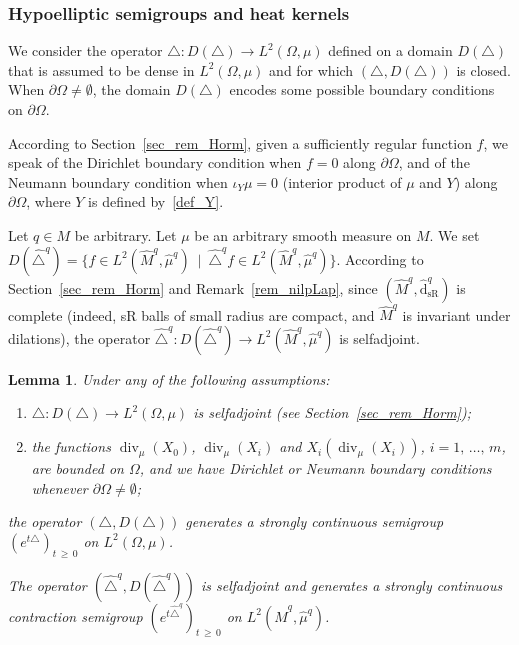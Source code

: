 \documentclass[10pt]{amsart}
\newtheorem{lemm}[theo]{Lemma}\newtheorem{prop}[theo]{Proposition}\newtheorem{coro}[theo]{Corollary}\newtheorem{conj}[theo]{Conjecture}
\theoremstyle{definition}\newtheorem{defi}[theo]{Definition}\newtheorem{rema}[theo]{Remark}\newtheorem{exam}[theo]{Example}\newtheorem{exem}[theo]{Example}\newtheorem{nota}[theo]{Notation}
\DeclareMathOperator{\divl}{div}
\newcommand{\hatdsR}{\widehat{\mathrm{d}}_{\mathrm{sR}}}
\renewcommand{\geq}{\geqslant}
\newcommand*{\Alphenumi}{\renewcommand*{\theenumi}{\bf{\Alph{enumi}}}}
\begin{document}
\subsubsection{Hypoelliptic semigroups and heat kernels}\label{sec_kernel}
We consider the operator $\triangle:D(\triangle)\rightarrow L^2(\Omega,\mu)$ defined on a domain $D(\triangle)$ that is assumed to be dense in $L^2(\Omega,\mu)$ and for which $(\triangle,D(\triangle))$ is closed. When $\partial\Omega\neq\emptyset$, the domain $D(\triangle)$ encodes some possible boundary conditions on $\partial\Omega$.

According to Section~\ref{sec_rem_Horm}, given a sufficiently regular function $f$, we speak of the Dirichlet boundary condition when $f=0$ along $\partial\Omega$, and of the Neumann boundary condition when $\iota_Y\mu=0$ (interior product of $\mu$ and $Y$) along $\partial\Omega$, where $Y$ is defined by~\eqref{def_Y}.


Let $q\in M$ be arbitrary. Let $\mu$ be an arbitrary smooth measure on $M$. We set $D(\widehat{\triangle}^{q}) = \{ f\in L^2(\widehat M^{q},\widehat\mu^{q})\ \mid\ \widehat{\triangle}^{q} f\in L^2(\widehat M^{q},\widehat\mu^{q}) \}$. According to Section~\ref{sec_rem_Horm} and Remark~\ref{rem_nilpLap}, since $(\widehat M^{q},\hatdsR^{q})$ is complete (indeed, sR balls of small radius are compact, and $\widehat M^{q}$ is invariant under dilations), the operator $\widehat{\triangle}^{q}:D(\widehat{\triangle}^{q})\rightarrow L^2(\widehat M^{q},\widehat\mu^{q})$ is selfadjoint.

\begin{lemm}\label{lem_semigroup}
Under any of the following assumptions:
\begin{enumerate}\Alphenumi
\item\label{caseA}
$\triangle:D(\triangle)\rightarrow L^2(\Omega,\mu)$ is selfadjoint (see Section~\ref{sec_rem_Horm});
\item\label{caseB}
the functions $\divl_\mu(X_0)$, $\divl_\mu(X_i)$ and $X_i(\divl_\mu(X_i))$, $i=1,\,\ldots,\,m$, are boun\-ded on $\Omega$, and we have Dirichlet or Neumann boundary conditions whenever $\partial\Omega\neq\emptyset$;
\end{enumerate}
the operator $(\triangle,D(\triangle))$ generates a strongly continuous semigroup $(e^{t\triangle})_{t\,\geq\,0}$ on $L^2(\Omega,\mu)$.

The operator $(\widehat{\triangle}^{q},D(\widehat{\triangle}^{q}))$ is selfadjoint and generates a strongly continuous contraction semigroup $(e^{t\widehat{\triangle}^{q}})_{t\,\geq\,0}$ on $L^2(\widehat M^{q},\widehat\mu^{q})$.
\end{lemm}
\end{document}
